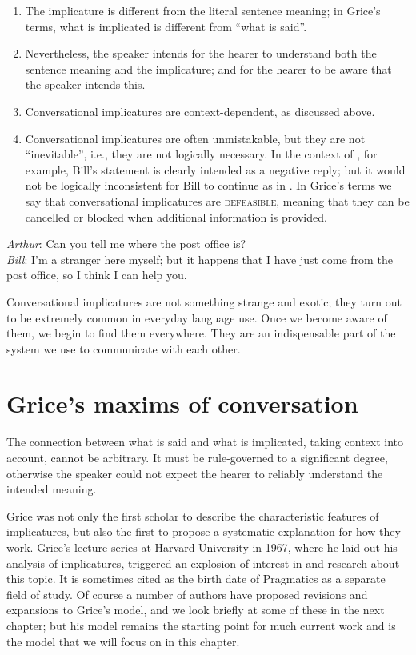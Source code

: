 \begin{enumerate}[label=\roman*.]
\item The implicature is different from the literal sentence meaning; in Grice’s terms, what is implicated is different from “what is said”.
\item Nevertheless, the speaker intends for the hearer to understand both the sentence meaning and the implicature; and for the hearer to be aware that the speaker intends this.
\item Conversational implicatures are context-dependent, as discussed above.
\item Conversational implicatures are often unmistakable, but they are not “inevitable”, i.e., they are not logically necessary. In the context of , for example, Bill’s statement is clearly intended as a negative reply; but it would not be logically inconsistent for Bill to continue as in . In Grice’s terms we say that conversational implicatures are \textsc{defeasible}, meaning that they can be cancelled or blocked when additional information is provided.
\end{enumerate}

\ea \label{ex:8.4}
\textit{Arthur}: Can you tell me where the post office is?\\
\textit{Bill}: I’m a stranger here myself; but it happens that I have just come from the post office, so I think I can help you.
\z


Conversational implicatures are not something strange and exotic; they turn out to be extremely common in everyday language use. Once we become aware of them, we begin to find them everywhere. They are an indispensable part of the system we use to communicate with each other.


\section{Grice’s maxims of conversation}\label{sec:8.3}

The connection between what is said and what is implicated, taking context into account, cannot be arbitrary. It must be rule-governed to a significant degree, otherwise the speaker could not expect the hearer to reliably understand the intended meaning.



Grice was not only the first scholar to describe the characteristic features of implicatures, but also the first to propose a systematic explanation for how they work. Grice’s lecture series at Harvard University in 1967, where he laid out his analysis of implicatures, triggered an explosion of interest in and research about this topic. It is sometimes cited as the birth date of Pragmatics as a separate field of study. Of course a number of authors have proposed revisions and expansions to Grice’s model, and we look briefly at some of these in the next chapter; but his model remains the starting point for much current work and is the model that we will focus on in this chapter.



